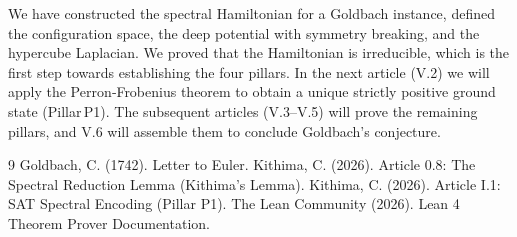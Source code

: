 \documentclass[11pt,a4paper]{article}
\begin{document}
We have constructed the spectral Hamiltonian for a Goldbach instance, defined the configuration space, the deep potential with symmetry breaking, and the hypercube Laplacian. We proved that the Hamiltonian is irreducible, which is the first step towards establishing the four pillars. In the next article (V.2) we will apply the Perron‑Frobenius theorem to obtain a unique strictly positive ground state (Pillar P1). The subsequent articles (V.3–V.5) will prove the remaining pillars, and V.6 will assemble them to conclude Goldbach's conjecture.


\begin{thebibliography}{9}
  Goldbach, C. (1742). Letter to Euler.
  Kithima, C. (2026). Article 0.8: The Spectral Reduction Lemma (Kithima's Lemma).
  Kithima, C. (2026). Article I.1: SAT Spectral Encoding (Pillar P1).
  The Lean Community (2026). Lean 4 Theorem Prover Documentation.
\end{thebibliography}
\end{document}
